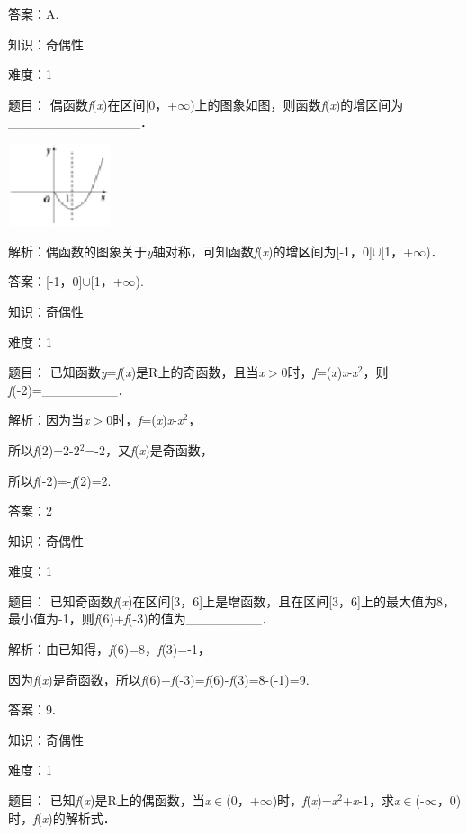 \documentclass{article} %
\begin{document}
答案：A.

知识：奇偶性

难度：1

题目：
偶函数\textit{f}(\textit{x})在区间[0，+$\mathrm{\infty}$)上的图象如图，则函数\textit{f}(\textit{x})的增区间为\_\_\_\_\_\_\_\_\_\_\_\_\_\_．

\includegraphics*[width=1.19in, height=0.95in, keepaspectratio=false]{image41}

解析：偶函数的图象关于\textit{y}轴对称，可知函数\textit{f}(\textit{x})的增区间为[-1，0]$\mathrm{\cup}$[1，+$\mathrm{\infty}$)．

答案：[-1，0]$\mathrm{\cup}$[1，+$\mathrm{\infty}$).

知识：奇偶性

难度：1

题目：
已知函数\textit{y}=\textit{f}(\textit{x})是R上的奇函数，且当\textit{x}$\mathrm{>}$0时，\textit{f}=(\textit{x})\textit{x}-\textit{x}${}^{2}$，则\textit{f}(-2)=\_\_\_\_\_\_\_\_．

解析：因为当\textit{x}$\mathrm{>}$0时，\textit{f}=(\textit{x})\textit{x}-\textit{x}${}^{2}$，

所以\textit{f}(2)=2-2${}^{2}$=-2，又\textit{f}(\textit{x})是奇函数，

所以\textit{f}(-2)=-\textit{f}(2)=2.

答案：2

知识：奇偶性

难度：1

题目：
已知奇函数\textit{f}(\textit{x})在区间[3，6]上是增函数，且在区间[3，6]上的最大值为8，最小值为-1，则\textit{f}(6)+\textit{f}(-3)的值为\_\_\_\_\_\_\_\_．

解析：由已知得，\textit{f}(6)=8，\textit{f}(3)=-1，

因为\textit{f}(\textit{x})是奇函数，所以\textit{f}(6)+\textit{f}(-3)=\textit{f}(6)-\textit{f}(3)=8-(-1)=9.

答案：9.

知识：奇偶性

难度：1

题目：
已知\textit{f}(\textit{x})是R上的偶函数，当\textit{x}$\mathrm{\in}$(0，+$\mathrm{\infty}$)时，\textit{f}(\textit{x})=\textit{x}${}^{2}$+\textit{x}-1，求\textit{x}$\mathrm{\in}$(-$\mathrm{\infty}$，0)时，\textit{f}(\textit{x})的解析式．
\end{document}
